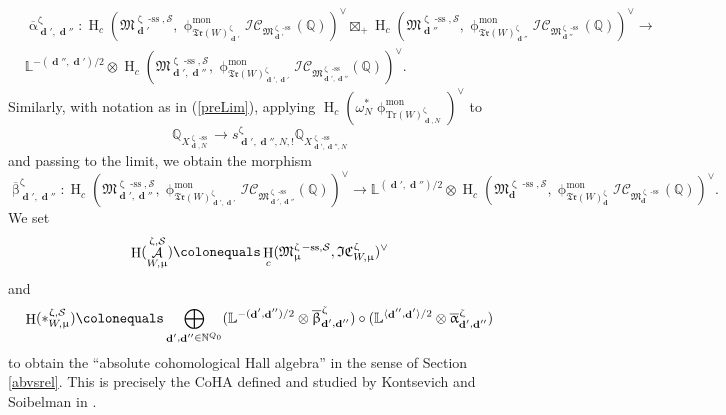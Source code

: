 \documentclass[a4paper,10pt]{amsart}
\renewcommand{\alpha}{\upalpha}
\renewcommand{\beta}{\upbeta}
\renewcommand{\zeta}{\upzeta}
\renewcommand{\phi}{\upphi}
\renewcommand{\mu}{\upmu}
\newcommand{\LL}{\mathbb{L}}
\newcommand{\NN}{\mathbb{N}}
\newcommand{\QQ}{\mathbb{Q}}
\newcommand{\SP}{\mathcal{S}}
\newcommand{\W}{\mathrm{Tr}(W)}
\newcommand{\WWW}{\mathfrak{Tr}(W)}
\newcommand{\Mst}{\mathfrak{M}}
\newcommand{\ICS}{\mathcal{IC}}
\newcommand{\ICSt}{\mathfrak{IC}}
\newcommand{\phim}[1]{\phi^{\mon}_{#1}}
\DeclareMathOperator{\sst}{-ss}
\DeclareMathOperator{\mon}{mon}
\DeclareMathOperator{\dd}{\mathbf{d}}
\DeclareMathOperator{\HO}{H}
\DeclareMathOperator{\Coha}{\mathcal{A}}
\begin{document}
\begin{align*}
&\overline{\alpha}^{\zeta}_{\dd',\dd''}\colon \HO_c\left(\Mst_{\dd'}^{\zeta\sst,\SP},\phim{\WWW^{\zeta}_{\dd'}}\ICS_{\Mst^{\zeta\sst}_{\dd'}}(\mathbb{Q})\right)^{\vee}\boxtimes_+\HO_c\left(\Mst_{\dd''}^{\zeta\sst,\SP},\phim{\WWW^{\zeta}_{\dd''}}\ICS_{\Mst^{\zeta\sst}_{\dd''}}(\mathbb{Q})\right)^{\vee}\rightarrow\\&\LL^{-(\dd'',\dd')/2}\otimes\HO_c\left(\Mst_{\dd',\dd''}^{\zeta\sst,\SP},\phim{\WWW^{\zeta}_{\dd',\dd'}}\ICS_{\Mst^{\zeta\sst}_{\dd',\dd''}}(\mathbb{Q})\right)^{\vee}.
\end{align*}
Similarly, with notation as in (\ref{preLim}), applying $\HO_c\left(\omega_N^*\phim{\W_{\dd,N}^{\zeta}}\right)^{\vee}$ to 
\[
\QQ_{X_{\dd,N}^{\zeta\sst}}\rightarrow s^{\zeta}_{\dd',\dd'',N,!}\QQ_{X_{\dd',\dd'',N}^{\zeta\sst}}
\]
and passing to the limit, we obtain the morphism
\[
\overline{\beta}^{\zeta}_{\dd',\dd''}\colon\HO_c\left(\Mst_{\dd',\dd''}^{\zeta\sst,\SP},\phim{\WWW^{\zeta}_{\dd',\dd'}}\ICS_{\Mst^{\zeta\sst}_{\dd',\dd''}}(\mathbb{Q})\right)^{\vee}\rightarrow \LL^{(\dd',\dd'')/2}\otimes \HO_c\left(\Mst_{\dd}^{\zeta\sst,\SP},\phim{\WWW^{\zeta}_{\dd}}\ICS_{\Mst^{\zeta\sst}_{\dd}}(\mathbb{Q})\right)^{\vee}.
\]
We set
\[
\HO(\Coha_{W,\mu}^{\zeta,\SP})\colonequals \HO_c(\Mst^{\zeta\sst,\SP}_{\mu},\ICSt^{\zeta}_{W,\mu})^{\vee}
\]
and 
\[
\HO(\ast_{W,\mu}^{\zeta,\SP})\colonequals \bigoplus_{\dd',\dd''\in\NN^{Q_0}} (\LL^{-(\dd',\dd'')/2}\otimes\overline{\beta}^{\zeta}_{\dd',\dd''})\circ(\LL^{\langle \dd'',\dd'\rangle/2}\otimes\overline{\alpha}^{\zeta}_{\dd',\dd''})
\]
to obtain the ``absolute cohomological Hall algebra'' in the sense of Section \ref{abvsrel}.  This is precisely the CoHA defined and studied by Kontsevich and Soibelman in \cite[Sec.7]{KS2}.
\end{document}
